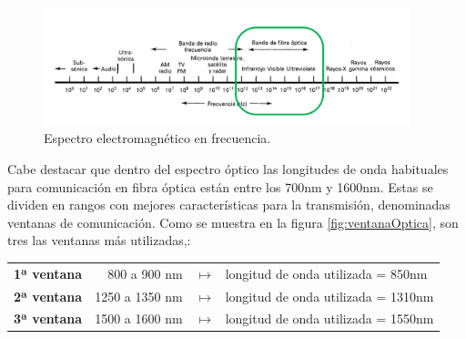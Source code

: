 	\begin{figure}[H]
		\centering
		\includegraphics[width=0.95\textwidth]{./img/espectrooptico}
		\caption{Espectro electromagnético en frecuencia.}
		\label{fig:espectroOptico}
	\end{figure}
	
	Cabe destacar que dentro del espectro óptico las longitudes de onda habituales para comunicación en fibra óptica están entre los 700nm y 1600nm. Estas se dividen en rangos con mejores características para la transmisión, denominadas ventanas de comunicación. Como se muestra en la figura \ref{fig:ventanaOptica}, son tres las ventanas más utilizadas,\cite{ventanasFO}:
 	\begin{table}[H]
		\hspace{2cm}
		\renewcommand{\arraystretch}{2}
		\begin{tabular}{rrl}
			\textbf{1ª ventana}& 800 a  900 nm  & $\longmapsto$ $\,$ longitud de onda utilizada = 850nm  \\
			\textbf{2ª ventana}& 1250 a 1350 nm & $\longmapsto$ $\,$ longitud de onda utilizada = 1310nm  \\
			\textbf{3ª ventana}& 1500 a 1600 nm & $\longmapsto$ $\,$ longitud de onda utilizada = 1550nm   \\ 
		\end{tabular} 
	\end{table}

